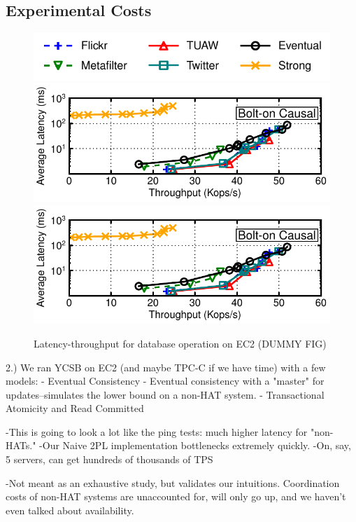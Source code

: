 \subsection{Experimental Costs}

\begin{figure}
\includegraphics[width=.8\columnwidth]{figs/macrotracelegend.pdf}\vspace{-2mm}
\includegraphics[width=\columnwidth]{figs/lat-thru-trace-K0-SCALEMACRO.pdf}
\includegraphics[width=\columnwidth]{figs/lat-thru-trace-K0-SCALEMACRO.pdf}
\caption{Latency-throughput for database operation on EC2 (DUMMY FIG)}
\label{fig:wan-exp}
\end{figure}

2.) We ran YCSB on EC2 (and maybe TPC-C if we have time) with a few models:
	- Eventual Consistency
	- Eventual consistency with a "master" for updates--simulates the lower bound on a non-HAT system.
	- Transactional Atomicity and Read Committed
	
	-This is going to look a lot like the ping tests: much higher latency for "non-HATs."
	-Our Naive 2PL implementation bottlenecks extremely quickly.
	-On, say, 5 servers, can get hundreds of thousands of TPS

	-Not meant as an exhaustive study, but validates our intuitions. Coordination costs of non-HAT systems are unaccounted for, will only go up, and we haven't even talked about availability.
